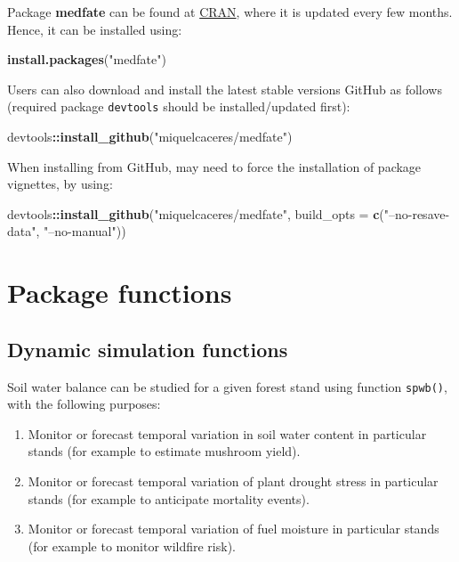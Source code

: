 \documentclass[]{book}
\newenvironment{Shaded}{\begin{snugshade}}{\end{snugshade}}
\newcommand{\KeywordTok}[1]{\textcolor[rgb]{0.13,0.29,0.53}{\textbf{#1}}}
\newcommand{\DataTypeTok}[1]{\textcolor[rgb]{0.13,0.29,0.53}{#1}}
\newcommand{\StringTok}[1]{\textcolor[rgb]{0.31,0.60,0.02}{#1}}
\newcommand{\OperatorTok}[1]{\textcolor[rgb]{0.81,0.36,0.00}{\textbf{#1}}}
\newcommand{\NormalTok}[1]{#1}
\providecommand{\tightlist}{%
  \setlength{\itemsep}{0pt}\setlength{\parskip}{0pt}}
\begin{document}
Package \textbf{medfate} can be found at
\href{https://CRAN.R-project.org/package=medfate}{CRAN}, where it is
updated every few months. Hence, it can be installed using:

\begin{Shaded}
\begin{Highlighting}[]
\KeywordTok{install.packages}\NormalTok{(}\StringTok{"medfate"}\NormalTok{)}
\end{Highlighting}
\end{Shaded}

Users can also download and install the latest stable versions GitHub as
follows (required package \texttt{devtools} should be installed/updated
first):

\begin{Shaded}
\begin{Highlighting}[]
\NormalTok{devtools}\OperatorTok{::}\KeywordTok{install_github}\NormalTok{(}\StringTok{"miquelcaceres/medfate"}\NormalTok{)}
\end{Highlighting}
\end{Shaded}

When installing from GitHub, may need to force the installation of
package vignettes, by using:

\begin{Shaded}
\begin{Highlighting}[]
\NormalTok{devtools}\OperatorTok{::}\KeywordTok{install_github}\NormalTok{(}\StringTok{"miquelcaceres/medfate"}\NormalTok{, }
                         \DataTypeTok{build_opts =} \KeywordTok{c}\NormalTok{(}\StringTok{"--no-resave-data"}\NormalTok{, }\StringTok{"--no-manual"}\NormalTok{))}
\end{Highlighting}
\end{Shaded}

\section{Package functions}\label{package-functions}

\subsection{Dynamic simulation
functions}\label{dynamic-simulation-functions}

Soil water balance can be studied for a given forest stand using
function \texttt{spwb()}, with the following purposes:

\begin{enumerate}
\def\labelenumi{\arabic{enumi}.}
\tightlist
\item
  Monitor or forecast temporal variation in soil water content in
  particular stands (for example to estimate mushroom yield).
\item
  Monitor or forecast temporal variation of plant drought stress in
  particular stands (for example to anticipate mortality events).
\item
  Monitor or forecast temporal variation of fuel moisture in particular
  stands (for example to monitor wildfire risk).
\end{enumerate}
\end{document}
